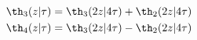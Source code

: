 \begin{equation}
    \begin{split}
      \th_3(z|\tau) &= \th_3(2z|4\tau) + \th_2(2z|4\tau) \\ 
      \th_4(z|\tau) &= \th_3(2z|4\tau) - \th_2(2z|4\tau)
    \end{split}
  \end{equation}

